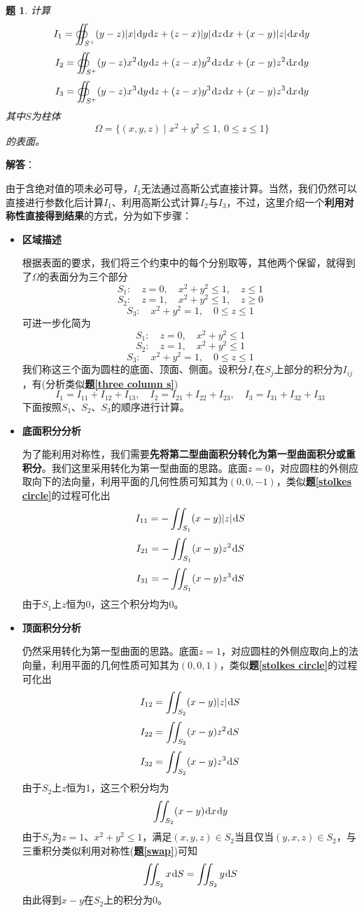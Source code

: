 \documentclass[a4paper,UTF8,fontset=windows,AutoFakeBold]{ctexart}
\newcommand*{\dr}{\hspace{0.07em}\mathrm{d}}
\theoremstyle{ex}
\newtheorem{exercise}{题}
\newcommand{\exref}[1]{\textbf{题\;\ref{#1}\;}}
\newcommand{\sol}[1]{{\vspace{5pt}\kaishu\noindent\textbf{解答}：\vspace{-3pt}
\begin{compactitem}
    \item[] #1
\end{compactitem}
}}
\begin{document}
\begin{framed}
\begin{exercise}\label{column normal}
    计算
    $$I_1=\oiint_{S^+}(y-z)|x|\dr y\dr z+(z-x)|y|\dr z\dr x+(x-y)|z|\dr x\dr y$$
    $$I_2=\oiint_{S^+}(y-z)x^2\dr y\dr z+(z-x)y^2\dr z\dr x+(x-y)z^2\dr x\dr y$$
    $$I_3=\oiint_{S^+}(y-z)x^3\dr y\dr z+(z-x)y^3\dr z\dr x+(x-y)z^3\dr x\dr y$$
    其中$S$为柱体
    $$\Omega=\{(x,y,z)\mid x^2+y^2\le1,\ 0\le z\le1\}$$
    的表面。
\end{exercise}
\sol{
    由于含绝对值的项未必可导，$I_1$无法通过高斯公式直接计算。当然，我们仍然可以直接进行参数化后计算$I_1$、利用高斯公式计算$I_2$与$I_3$，不过，这里介绍一个\textbf{利用对称性直接得到结果}的方式，分为如下步骤：
    \begin{itemize}
        \item \textbf{区域描述}
        
        根据表面的要求，我们将三个约束中的每个分别取等，其他两个保留，就得到了$\Omega$的表面分为三个部分
        $$S_1:\quad z=0,\quad x^2+y^2\le1,\quad z\le1$$
        $$S_2:\quad z=1,\quad x^2+y^2\le1,\quad z\ge0$$
        $$S_3:\quad x^2+y^2=1,\quad 0\le z\le1$$
        可进一步化简为
        $$S_1:\quad z=0,\quad x^2+y^2\le1$$
        $$S_2:\quad z=1,\quad x^2+y^2\le1$$
        $$S_3:\quad x^2+y^2=1,\quad 0\le z\le1$$
        我们称这三个面为圆柱的底面、顶面、侧面。设积分$I_i$在$S_j$上部分的积分为$I_{ij}$，有(分析类似\exref{three column s})
        $$I_1=I_{11}+I_{12}+I_{13},\quad I_2=I_{21}+I_{22}+I_{23},\quad I_3=I_{31}+I_{32}+I_{33}$$
        下面按照$S_1$、$S_2$、$S_3$的顺序进行计算。
        
        \item \textbf{底面积分分析}
        
        为了能利用对称性，我们需要\textbf{先将第二型曲面积分转化为第一型曲面积分或重积分}。我们这里采用转化为第一型曲面的思路。底面$z=0$，对应圆柱的外侧应取向下的法向量，利用平面的几何性质可知其为$(0,0,-1)$，类似\exref{stolkes circle}的过程可化出
        $$I_{11}=-\iint_{S_1}(x-y)|z|\dr S$$
        $$I_{21}=-\iint_{S_1}(x-y)z^2\dr S$$
        $$I_{31}=-\iint_{S_1}(x-y)z^3\dr S$$
        由于$S_1$上$z$恒为0，这三个积分均为0。

        \item \textbf{顶面积分分析}
        
        仍然采用转化为第一型曲面的思路。底面$z=1$，对应圆柱的外侧应取向上的法向量，利用平面的几何性质可知其为$(0,0,1)$，类似\exref{stolkes circle}的过程可化出
        $$I_{12}=\iint_{S_2}(x-y)|z|\dr S$$
        $$I_{22}=\iint_{S_2}(x-y)z^2\dr S$$
        $$I_{32}=\iint_{S_2}(x-y)z^3\dr S$$
        由于$S_2$上$z$恒为1，这三个积分均为
        $$\iint_{S_2}(x-y)\dr x\dr y$$
        由于$S_2$为$z=1$、$x^2+y^2\le1$，满足$(x,y,z)\in S_2$当且仅当$(y,x,z)\in S_2$，与三重积分类似利用对称性(\exref{swap})可知
        $$\iint_{S_2}x\dr S=\iint_{S_2}y\dr S$$
        由此得到$x-y$在$S_2$上的积分为0。
        

\end{itemize}}
\end{framed}
\end{document}
